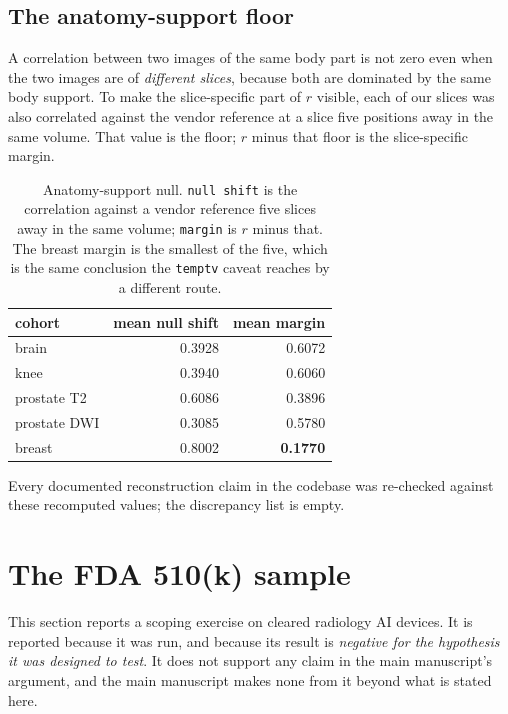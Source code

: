 \documentclass[11pt,a4paper]{article}
\begin{document}
\subsection{The anatomy-support floor}

A correlation between two images of the same body part is not zero even when the two
images are of \emph{different slices}, because both are dominated by the same body
support. To make the slice-specific part of $r$ visible, each of our slices was also
correlated against the vendor reference at a slice five positions away in the same
volume. That value is the floor; $r$ minus that floor is the slice-specific margin.

\begin{table}[htbp]
\centering
\caption{Anatomy-support null. \texttt{null shift} is the correlation against a
vendor reference five slices away in the same volume; \texttt{margin} is
$r$ minus that. The breast margin is the smallest of the five, which is the same
conclusion the \texttt{temptv} caveat reaches by a different route.}
\label{tab:anatomyfloor}
\small
\begin{tabular}{@{}lrr@{}}
\toprule
cohort & mean null shift & mean margin \\
\midrule
brain        & 0.3928 & 0.6072 \\
knee         & 0.3940 & 0.6060 \\
prostate T2  & 0.6086 & 0.3896 \\
prostate DWI & 0.3085 & 0.5780 \\
breast       & 0.8002 & \textbf{0.1770} \\
\bottomrule
\end{tabular}
\end{table}

\noindent Every documented reconstruction claim in the codebase was re-checked against
these recomputed values; the discrepancy list is empty.

\clearpage
\section{The FDA 510(k) sample}

This section reports a scoping exercise on cleared radiology AI devices. It is
reported because it was run, and because its result is \emph{negative for the
hypothesis it was designed to test}. It does not support any claim in the main
manuscript's argument, and the main manuscript makes none from it beyond what is
stated here.
\end{document}
